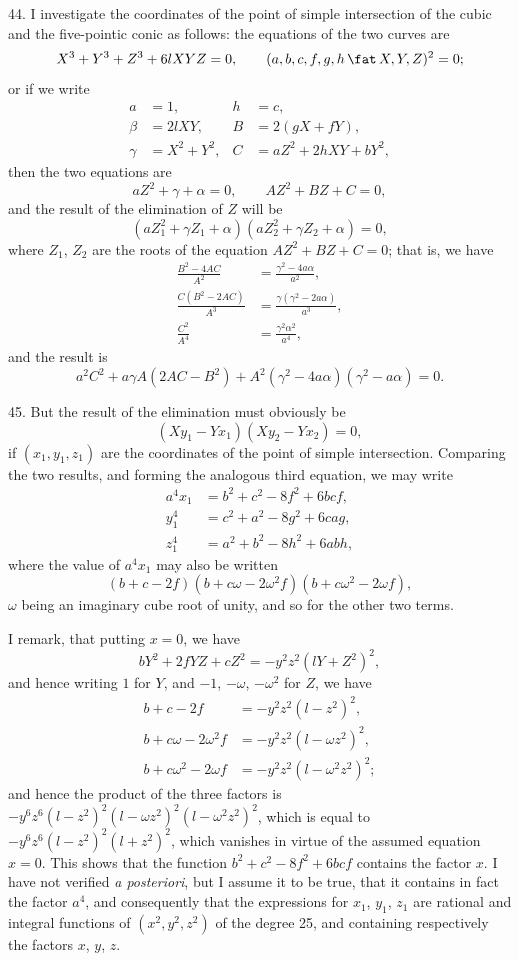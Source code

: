 \documentclass[11pt,a4paper]{book}
\begin{document}
44. I investigate the coordinates of the point of simple intersection of the cubic and the five-pointic conic as follows: the equations of the two curves are
\[
X^3+Y^3+Z^3+6lXYZ=0,\qquad (a,b,c,f,g,h\,\fat\, X,Y,Z)^2=0;
\]
or if we write
\begin{align*}
a &= 1, & h &= c,\\
\beta &= 2lXY, & B &= 2(gX+fY),\\
\gamma &= X^2+Y^2, & C &= aZ^2+2hXY+bY^2,
\end{align*}
then the two equations are
\[
aZ^2+\gamma+\alpha=0,\qquad AZ^2+BZ+C=0,
\]
and the result of the elimination of $Z$ will be
\[
(aZ_1^2+\gamma Z_1+\alpha)(aZ_2^2+\gamma Z_2+\alpha)=0,
\]
where $Z_1$, $Z_2$ are the roots of the equation $AZ^2+BZ+C=0$; that is, we have
\begin{align*}
\frac{B^2-4AC}{A^2} &= \frac{\gamma^2-4a\alpha}{a^2},\\
\frac{C(B^2-2AC)}{A^3} &= \frac{\gamma(\gamma^2-2a\alpha)}{a^3},\\
\frac{C^2}{A^4} &= \frac{\gamma^2\alpha^2}{a^4},
\end{align*}
and the result is
\[
a^2C^2+a\gamma A(2AC-B^2)+A^2(\gamma^2-4a\alpha)(\gamma^2-a\alpha)=0.
\]

45. But the result of the elimination must obviously be
\[
(Xy_1-Yx_1)(Xy_2-Yx_2)=0,
\]
if $(x_1,y_1,z_1)$ are the coordinates of the point of simple intersection. Comparing the two results, and forming the analogous third equation, we may write
\begin{align*}
a^4x_1 &= b^2+c^2-8f^2+6bcf,\\
y_1^4 &= c^2+a^2-8g^2+6cag,\\
z_1^4 &= a^2+b^2-8h^2+6abh,
\end{align*}
where the value of $a^4x_1$ may also be written
\[
(b+c-2f)(b+c\omega-2\omega^2f)(b+c\omega^2-2\omega f),
\]
$\omega$ being an imaginary cube root of unity, and so for the other two terms.

I remark, that putting $x=0$, we have
\[
bY^2+2fYZ+cZ^2=-y^2z^2(lY+Z^2)^2,
\]
and hence writing $1$ for $Y$, and $-1$, $-\omega$, $-\omega^2$ for $Z$, we have
\begin{align*}
b+c-2f &= -y^2z^2(l-z^2)^2,\\
b+c\omega-2\omega^2f &= -y^2z^2(l-\omega z^2)^2,\\
b+c\omega^2-2\omega f &= -y^2z^2(l-\omega^2z^2)^2;
\end{align*}
and hence the product of the three factors is $-y^6z^6(l-z^2)^2(l-\omega z^2)^2(l-\omega^2z^2)^2$, which is equal to $-y^6z^6(l-z^2)^2(l+z^2)^2$, which vanishes in virtue of the assumed equation $x=0$. This shows that the function $b^2+c^2-8f^2+6bcf$ contains the factor $x$. I have not verified \textit{a posteriori}, but I assume it to be true, that it contains in fact the factor $a^4$, and consequently that the expressions for $x_1$, $y_1$, $z_1$ are rational and integral functions of $(x^2,y^2,z^2)$ of the degree 25, and containing respectively the factors $x$, $y$, $z$.
\end{document}
